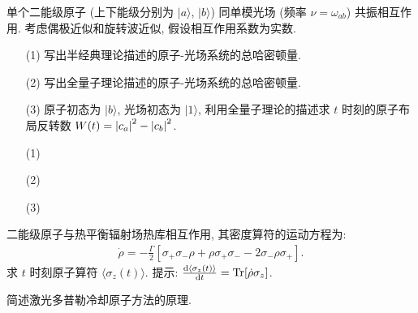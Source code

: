 \documentclass{assignment}
\begin{document}
\begin{prob}
    单个二能级原子 (上下能级分别为 $\lvert a\rangle$, $\lvert b\rangle$) 同单模光场 (频率 $\nu=\omega_{ab}$) 共振相互作用. 考虑偶极近似和旋转波近似, 假设相互作用系数为实数.
    \begin{itemize}
        \item[(1)] 写出半经典理论描述的原子-光场系统的总哈密顿量.
        \item[(2)] 写出全量子理论描述的原子-光场系统的总哈密顿量.
        \item[(3)] 原子初态为 $\lvert b\rangle$, 光场初态为 $\lvert 1\rangle$, 利用全量子理论的描述求 $t$ 时刻的原子布局反转数 $W(t)=\left\lvert c_a\right\rvert^2-\left\lvert c_b\right\rvert^2$.
    \end{itemize}
\end{prob}
\begin{sol}
    \begin{itemize}
        \item[(1)] 
        \item[(2)] 
        \item[(3)] 
    \end{itemize}
\end{sol}

\begin{prob}
    二能级原子与热平衡辐射场热库相互作用, 其密度算符的运动方程为:
    \begin{align}
        \dot{\rho}=-\frac{\Gamma}{2}[\sigma_+\sigma_-\rho+\rho\sigma_+\sigma_--2\sigma_-\rho\sigma_+].
    \end{align}
    求 $t$ 时刻原子算符 $\langle\sigma_z(t)\rangle$. 提示: $\frac{\mathrm{d}\langle\sigma_z(t)\rangle}{\mathrm{d}t}=\operatorname{Tr}[\dot{\rho}\sigma_z]$.
\end{prob}
\begin{sol}
    
\end{sol}

\begin{prob}
    简述激光多普勒冷却原子方法的原理.
\end{prob}
\begin{sol}
    
\end{sol}
\end{document}
